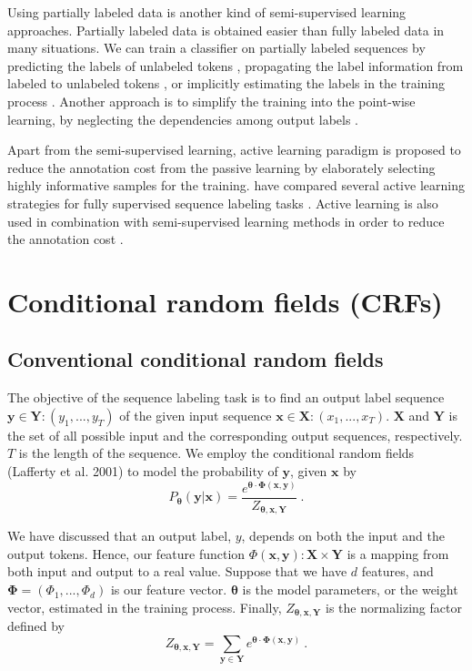 \documentclass[english]{jnlp_JS2.0}
\begin{document}
Using partially labeled data is another kind of semi-supervised learning approaches. Partially labeled data is obtained easier than fully labeled data in many situations. We can train a classifier on partially labeled sequences by predicting the labels of unlabeled tokens \cite{Tomanek2009}, propagating the label information from labeled to unlabeled tokens \cite{Culotta2005}, or implicitly estimating the labels in the training process \cite{Bellare2007,Tsuboi2008}. Another approach is to simplify the training into the point-wise learning, by neglecting the dependencies among output labels \cite{Neubig2010}.

Apart from the semi-supervised learning, active learning paradigm is proposed to reduce the annotation cost from the passive learning by elaborately selecting highly informative samples for the training. \cite{Settles2008} have compared several active learning strategies for fully supervised sequence labeling tasks . Active learning is also used in combination with semi-supervised learning methods in order to reduce the annotation cost \cite{Tomanek2009,Dasgupta2009}.


\section{Conditional random fields (CRFs)}
\label{Sec:CRFs}


\subsection{Conventional conditional random fields}
\label{Sec:ConventionalCRFs}

The objective of the sequence labeling task is to find an output label sequence $\mathbf{y} \in \mathbf{Y} : (y_1,...,y_T)$ of the given input sequence $\mathbf{x} \in \mathbf{X} : (x_1,...,x_T)$. $\mathbf{X}$ and $\mathbf{Y}$ is the set of all possible input and the corresponding output sequences, respectively. $T$ is the length of the sequence. We employ the conditional random fields
(Lafferty et al. 2001)
 to model the probability of $\mathbf{y}$, given $\mathbf{x}$ by
\begin{equation}
	P_{\mathbf{\theta}}(\mathbf{y|x}) = \frac {e^{\mathbf{\theta \cdot \Phi (x,y)}}} {Z_{\mathbf{\theta, x, Y}}}\ . \label{Eq:ProbCRFs}
\end{equation}

We have discussed that an output label, $y$, depends on both the input and the output tokens. Hence, our feature function $\Phi\mathbf{(x,y)}:\mathbf{X \times Y}$ is a mapping from both input and output to a real value. Suppose that we have $d$ features, and $\mathbf{\Phi}=(\Phi_1,...,\Phi_d)$ is our feature vector. $\mathbf{\theta}$ is the model parameters, or the weight vector, estimated in the training process. Finally, $Z_{\mathbf{\theta, x, Y}}$ is the normalizing factor defined by
\[
	Z_\mathbf{\theta,x,Y} = \sum_{\mathbf{y \in Y}} e^{\mathbf{\theta \cdot \Phi (x,y)}}\ .
\]
\end{document}
